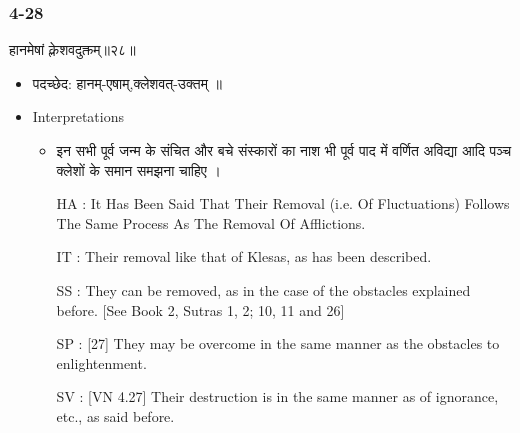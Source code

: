 \begin{frame}[fragile]\frametitle{4-28}
\begin{sanskrit}
हानमेषां क्लेशवदुक्तम्॥२८॥
\end{sanskrit}

	\begin{itemize}
	\item पदच्छेद:  हानम्-एषाम्,क्लेशवत्-उक्तम् ॥
	\item Interpretations
		\begin{itemize}	
		\item इन सभी पूर्व जन्म के संचित और बचे संस्कारों का नाश भी पूर्व पाद में वर्णित अविद्या आदि पञ्च क्लेशों के समान समझना चाहिए ।
		\item [HA]: It Has Been Said That Their Removal (i.e. Of Fluctuations) Follows The Same Process As The Removal Of Afflictions.
		\item [IT]: Their removal like that of Klesas, as has been described.
		\item [SS]: They can be removed, as in the case of the obstacles explained before. [See Book 2, Sutras 1, 2; 10, 11 and 26]
		\item [SP]: [27] They may be overcome in the same manner as the obstacles to enlightenment.
		\item [SV]: [VN 4.27] Their destruction is in the same manner as of ignorance, etc., as said before. 
		\end{itemize}
	\end{itemize}
\end{frame}


